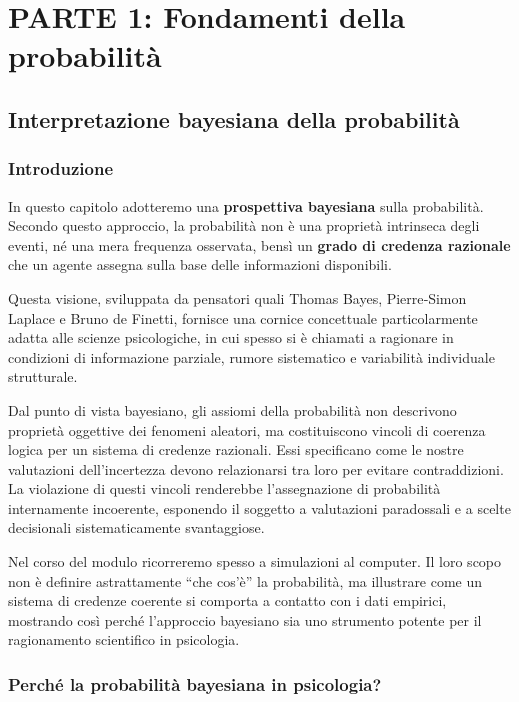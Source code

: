 \documentclass[
  italian,
  letterpaper,
  a4paper,
  11pt,
  open=any]{scrbook}
\theoremstyle{plain}
\theoremstyle{definition}
\theoremstyle{definition}
\theoremstyle{remark}
\begin{document}
\part{PARTE 1: Fondamenti della probabilità}

\chapter{Interpretazione bayesiana della
probabilità}\label{sec-prob-interpretation}

\section*{Introduzione}\label{introduzione}


In questo capitolo adotteremo una \textbf{prospettiva bayesiana} sulla
probabilità. Secondo questo approccio, la probabilità non è una
proprietà intrinseca degli eventi, né una mera frequenza osservata,
bensì un \textbf{grado di credenza razionale} che un agente assegna
sulla base delle informazioni disponibili.

Questa visione, sviluppata da pensatori quali Thomas Bayes, Pierre‑Simon
Laplace e Bruno de Finetti, fornisce una cornice concettuale
particolarmente adatta alle scienze psicologiche, in cui spesso si è
chiamati a ragionare in condizioni di informazione parziale, rumore
sistematico e variabilità individuale strutturale.

Dal punto di vista bayesiano, gli assiomi della probabilità non
descrivono proprietà oggettive dei fenomeni aleatori, ma costituiscono
vincoli di coerenza logica per un sistema di credenze razionali. Essi
specificano come le nostre valutazioni dell'incertezza devono
relazionarsi tra loro per evitare contraddizioni. La violazione di
questi vincoli renderebbe l'assegnazione di probabilità internamente
incoerente, esponendo il soggetto a valutazioni paradossali e a scelte
decisionali sistematicamente svantaggiose.

Nel corso del modulo ricorreremo spesso a simulazioni al computer. Il
loro scopo non è definire astrattamente ``che cos'è'' la probabilità, ma
illustrare come un sistema di credenze coerente si comporta a contatto
con i dati empirici, mostrando così perché l'approccio bayesiano sia uno
strumento potente per il ragionamento scientifico in psicologia.

\section*{Perché la probabilità bayesiana in
psicologia?}\label{perchuxe9-la-probabilituxe0-bayesiana-in-psicologia}
\end{document}
